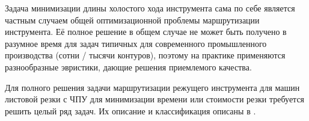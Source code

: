 \documentclass[12pt]{a&t}
\begin{document}
Задача минимизации длины холостого хода инструмента
сама по себе является частным случаем
общей оптимизационной проблемы
маршрутизации инструмента.
Её полное решение в общем случае
не может быть получено
в разумное время
для задач типичных для современного
промышленного производства
(сотни / тысячи контуров),
поэтому на практике применяются разнообразные эвристики,
дающие решения приемлемого качества.

Для полного решения задачи маршрутизации
режущего инструмента для машин листовой резки
с ЧПУ
для минимизации времени или стоимости резки
требуется решить целый ряд задач.
Их описание и классификация описаны в
\cite{bi01,bi02,bi03}.







\end{document}
